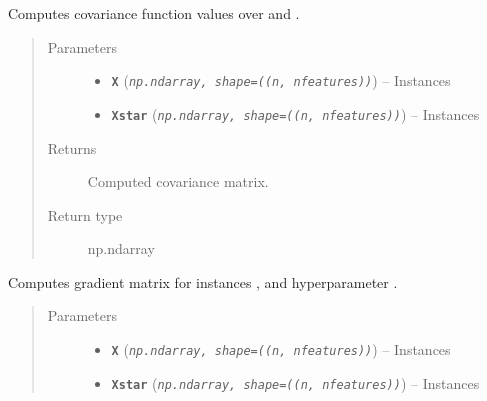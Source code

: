 \documentclass[letterpaper,10pt,english]{sphinxmanual}
\begin{document}
\begin{fulllineitems}
\begin{quote}
\begin{description}
\end{description}\end{quote}

\begin{fulllineitems}
\label{pyGPGO.covfunc:pyGPGO.covfunc.rationalQuadratic.K}
Computes covariance function values over  and .
\begin{quote}\begin{description}
\item[{Parameters}] \leavevmode\begin{itemize}
\item {} 
\textbf{\texttt{X}} (\emph{\texttt{np.ndarray, shape=((n, nfeatures))}}) -- Instances

\item {} 
\textbf{\texttt{Xstar}} (\emph{\texttt{np.ndarray, shape=((n, nfeatures))}}) -- Instances

\end{itemize}

\item[{Returns}] \leavevmode
Computed covariance matrix.

\item[{Return type}] \leavevmode
np.ndarray

\end{description}\end{quote}

\end{fulllineitems}


\begin{fulllineitems}
\label{pyGPGO.covfunc:pyGPGO.covfunc.rationalQuadratic.gradK}
Computes gradient matrix for instances ,  and hyperparameter .
\begin{quote}\begin{description}
\item[{Parameters}] \leavevmode\begin{itemize}
\item {} 
\textbf{\texttt{X}} (\emph{\texttt{np.ndarray, shape=((n, nfeatures))}}) -- Instances

\item {} 
\textbf{\texttt{Xstar}} (\emph{\texttt{np.ndarray, shape=((n, nfeatures))}}) -- Instances


\end{itemize}
\end{description}
\end{quote}
\end{fulllineitems}
\end{fulllineitems}
\end{document}
